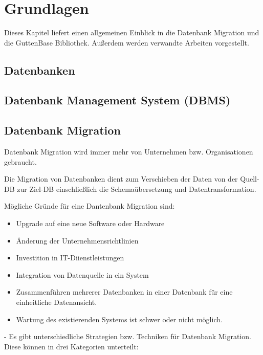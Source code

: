 \chapter{Grundlagen}
Dieses Kapitel liefert einen allgemeinen Einblick in die Datenbank Migration und die GuttenBase Bibliothek. Außerdem werden verwandte Arbeiten vorgestellt. 
\section{Datenbanken}

\section{Datenbank Management System (DBMS)}

\section{Datenbank Migration}




Datenbank Migration wird immer mehr von Unternehmen bzw. Organisationen gebraucht. 

Die Migration von Datenbanken dient zum Verschieben der Daten von der Quell-DB zur Ziel-DB einschließlich die Schemaübersetzung und Datentransformation.


Mögliche Gründe für eine Dantenbank Migration sind:
\begin{itemize}
	\item Upgrade auf eine neue Software oder Hardware
	\item Änderung der Unternehmensrichtlinien
	\item Investition in IT-Diienstleistungen
	\item Integration von Datenquelle in ein System
	\item Zusammenführen mehrerer Datenbanken in einer Datenbank für eine einheitliche Datenansicht.
	\item Wartung des existierenden Systems ist schwer oder nicht möglich.
\end{itemize}

- Es gibt unterschiedliche Strategien bzw. Techniken für Datenbank Migration. Diese können in drei Kategorien unterteilt:

